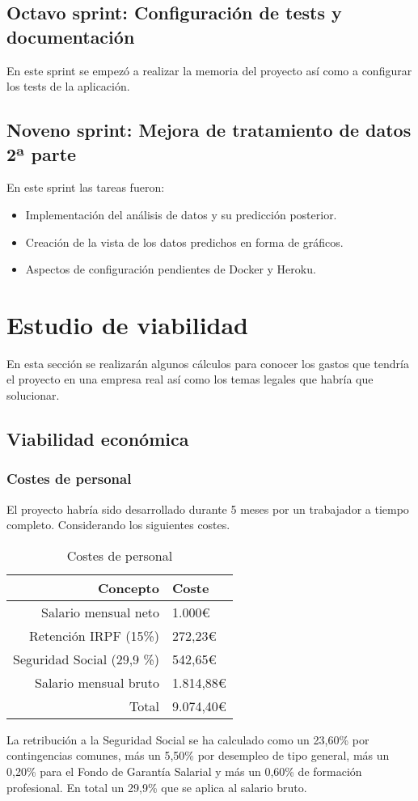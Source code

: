 \subsection{Octavo sprint: Configuración de tests y documentación}
En este sprint se empezó a realizar la memoria del proyecto así como a configurar los tests de la aplicación.
\subsection{Noveno sprint: Mejora de tratamiento de datos 2ª parte}
En este sprint las tareas fueron:
\begin{itemize}
    \item Implementación del análisis de datos y su predicción posterior.
    \item Creación de la vista de los datos predichos en forma de gráficos.
    \item Aspectos de configuración pendientes de Docker y Heroku.
\end{itemize}
\section{Estudio de viabilidad}
En esta sección se realizarán algunos cálculos para conocer los gastos que tendría el proyecto en una empresa real así como los temas legales que habría que solucionar.
\subsection{Viabilidad económica}
\subsubsection{Costes de personal}
El proyecto habría sido desarrollado durante 5 meses por un trabajador a tiempo completo. Considerando los siguientes costes.
\begin{table}[h]
    \begin{center}
        \begin{tabular}{ r | l }
        Concepto & Coste \\ \hline
        Salario mensual neto & 1.000\euro \\
        Retención IRPF (15\%) & 272,23\euro \\
        Seguridad Social (29,9 \%) & 542,65\euro \\
        Salario mensual bruto &  1.814,88\euro\\ 
        Total & 9.074,40\euro \\ 
        \end{tabular}
    \caption{Costes de personal}
    \label{tab:costesPersonal}
    \end{center}
\end{table}
La retribución a la Seguridad Social se ha calculado como un 23,60\% por contingencias comunes, más un 5,50\% por desempleo de tipo general, más un 0,20\% para el Fondo de Garantía Salarial y más un 0,60\% de formación profesional. En total un 29,9\% que se aplica al salario bruto.

